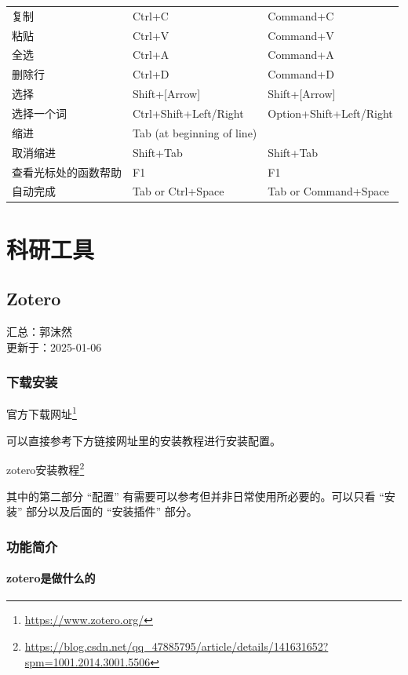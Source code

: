 \documentclass[]{ctexbook}
\renewcommand{\href}[2]{#2\footnote{\url{#1}}}
\theoremstyle{definition}
\theoremstyle{definition}
\theoremstyle{definition}
\theoremstyle{definition}
\theoremstyle{remark}
\begin{document}
\begin{longtable}[]{@{}lll@{}}
复制 & Ctrl+C & Command+C \\
粘贴 & Ctrl+V & Command+V \\
全选 & Ctrl+A & Command+A \\
删除行 & Ctrl+D & Command+D \\
选择 & Shift+{[}Arrow{]} & Shift+{[}Arrow{]} \\
选择一个词 & Ctrl+Shift+Left/Right & Option+Shift+Left/Right \\
缩进 & Tab (at beginning of line) & \\
取消缩进 & Shift+Tab & Shift+Tab \\
查看光标处的函数帮助 & F1 & F1 \\
自动完成 & Tab or Ctrl+Space & Tab or Command+Space \\
\end{longtable}

\part{科研工具}\label{part-ux79d1ux7814ux5de5ux5177}

\chapter{Zotero}\label{zotero}

汇总：郭沫然\\
更新于：2025-01-06

\section{下载安装}\label{ux4e0bux8f7dux5b89ux88c5}

\href{https://www.zotero.org/}{官方下载网址}

可以直接参考下方链接网址里的安装教程进行安装配置。

\href{https://blog.csdn.net/qq_47885795/article/details/141631652?spm=1001.2014.3001.5506}{zotero安装教程}

其中的第二部分 ``配置'' 有需要可以参考但并非日常使用所必要的。可以只看 ``安装'' 部分以及后面的 ``安装插件'' 部分。

\section{功能简介}\label{ux529fux80fdux7b80ux4ecb}

\subsection{zotero是做什么的}\label{zoteroux662fux505aux4ec0ux4e48ux7684}
\end{document}

